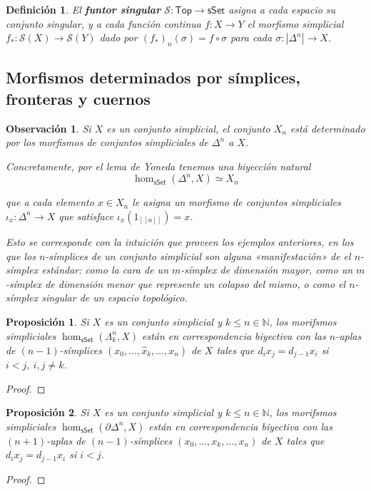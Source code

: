 \documentclass[11pt]{report}
\theoremstyle{colored}
\newtheorem{definition}{Definición}[section]
\newtheorem{proposition}{Proposición}[section]
\newtheorem{remark}{Observación}[section]
\newcommand{\N}{\mathbb{N}}
\newcommand{\nat}[1]{[\![#1]\!]}
\newcommand{\ord}[1]{\nat{#1}}
\newcommand{\cat}[1]{\mathsf{#1}}
\renewcommand{\ss}[1]{\Delta^{#1}}
\newcommand{\horn}[2]{\Lambda^{#1}_{#2}}
\begin{document}
\begin{definition} El \textbf{funtor singular} $\mathcal{S} : \cat{Top} \to \cat{sSet}$ asigna a cada espacio su conjunto singular, y a cada función continua $f : X \to Y$ el morfismo simplicial $f_* : \mathcal{S}(X) \to \mathcal{S}(Y)$ dado por $(f_*)_n(\sigma) =  f \circ \sigma$ para cada $\sigma: |\ss{n}| \to X$.
\end{definition}

\subsection{Morfismos determinados por símplices, fronteras y cuernos}

\begin{remark} Si $X$ es un conjunto simplicial, el conjunto $X_n$ está determinado por los morfismos de conjuntos simpliciales de $\ss{n}$ a $X$. 

Concretamente, por el lema de Yoneda tenemos una biyección natural
\[
\hom_{\cat{sSet}}(\ss{n},X) \simeq X_n
\]

que a cada elemento $x \in X_n$ le asigna un morfismo de conjuntos simpliciales $\iota_x : \ss{n} \to X$ que satisface $\iota_x(1_{\ord{n}}) = x$. 

Esto se corresponde con la intuición que proveen los ejemplos anteriores, en los que los $n$-símplices de un conjunto simplicial son alguna «manifestación» de el $n$-símplex estándar: como la cara de un $m$-símplex de dimensión mayor, como un $m$-símplex de dimensión menor que represente un colapso del mismo, o como el $n$-símplex singular de un espacio topológico.\\
\end{remark}

\begin{proposition} Si $X$ es un conjunto simplicial y $k \leq n \in \N$, los morifsmos simpliciales $\hom_{\cat{sSet}}(\horn{n}{k}, X)$ están en correspondencia biyectiva con las $n$-uplas de $(n-1)$-símplices $(x_0,\dots,\widehat{x}_k,\dots, x_n)$ de $X$ tales que $d_ix_j = d_{j-1}x_i$ si $i < j, \ i,j \neq k$. 
\end{proposition}
\begin{proof} 
\end{proof}

\begin{proposition} Si $X$ es un conjunto simplicial y $k \leq n \in \N$, los morifsmos simpliciales $\hom_{\cat{sSet}}(\partial\ss{n}, X)$ están en correspondencia biyectiva con las $(n+1)$-uplas de $(n-1)$-símplices $(x_0,\dots,x_k,\dots, x_n)$ de $X$ tales que $d_ix_j = d_{j-1}x_i$ si $i < j$.
\end{proposition}
\begin{proof} 
\end{proof}
\end{document}
